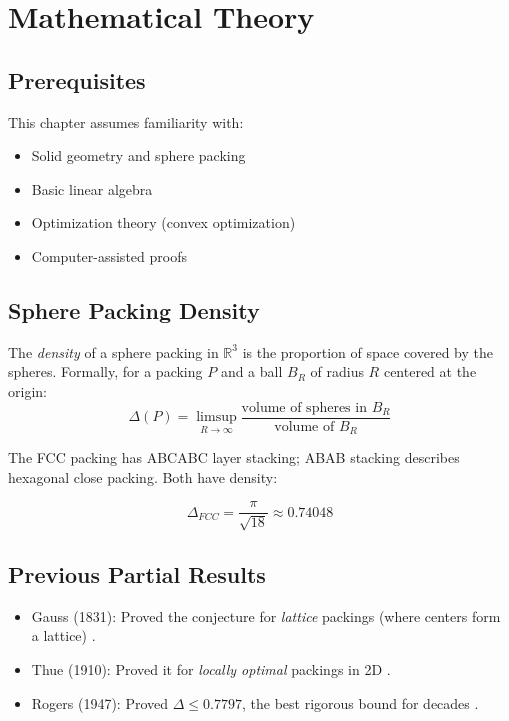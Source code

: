 \section{Mathematical Theory}


\subsection{Prerequisites}
This chapter assumes familiarity with:
\begin{itemize}
\item Solid geometry and sphere packing
\item Basic linear algebra
\item Optimization theory (convex optimization)
\item Computer-assisted proofs
\end{itemize}

\subsection{Sphere Packing Density}

\begin{definition}
The \emph{density} of a sphere packing in $\mathbb{R}^3$ is the proportion of space covered by the spheres. Formally, for a packing $P$ and a ball $B_R$ of radius $R$ centered at the origin:
\[\Delta(P) = \limsup_{R \to \infty} \frac{\text{volume of spheres in } B_R}{\text{volume of } B_R}\]
\end{definition}

The FCC packing has ABCABC layer stacking; ABAB stacking describes hexagonal close packing. Both have density:

\begin{equation}
\Delta_{FCC} = \frac{\pi}{\sqrt{18}} \approx 0.74048
\end{equation}

\subsection{Previous Partial Results}

\begin{itemize}
\item Gauss (1831): Proved the conjecture for \emph{lattice} packings (where centers form a lattice) \cite{gauss1831}.
\item Thue (1910): Proved it for \emph{locally optimal} packings in 2D \cite{thue1910}.
\item Rogers (1947): Proved $\Delta \leq 0.7797$, the best rigorous bound for decades \cite{rogers1947}.
\end{itemize}


